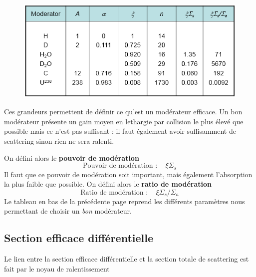 	\begin{figure}
	\vspace{-8mm}
	\includegraphics[scale=0.6]{ch7/image4.png}
	\end{figure}
	Ces grandeurs permettent de définir ce qu'est un modérateur efficace. Un bon modérateur présente
	un gain moyen en lethargie par collision le plus élevé que possible mais ce n'est pas 
	suffisant : il faut également avoir suffisamment de scattering sinon rien ne sera ralenti. 

	\newpage 
	On défini alors le \textbf{pouvoir de modération}
	\begin{equation}
	\text{Pouvoir de modération }: \quad \xi\Sigma_s
	\end{equation}
	Il faut que ce pouvoir de modération soit important, mais également l'absorption la plus faible
	que possible. On défini alors le \textbf{ratio de modération}
	\begin{equation}
	\text{Ratio de modération }: \quad \xi\Sigma_s/\Sigma_a		
	\end{equation}
	Le tableau en bas de la précédente page reprend les différents paramètres nous permettant de 
	choisir un \textit{bon} modérateur. 


	\subsection{Section efficace différentielle}
	Le lien entre la section efficace différentielle et la section totale de scattering est fait par
	le noyau de ralentissement\\
	
	\ \\
	
